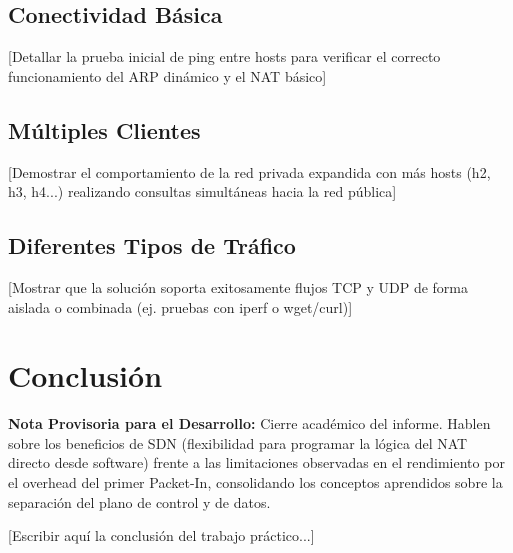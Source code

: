 \documentclass[11pt, a4paper]{article}
\begin{document}
\subsection{Conectividad Básica}
[Detallar la prueba inicial de ping entre hosts para verificar el correcto funcionamiento del ARP dinámico y el NAT básico]

\subsection{Múltiples Clientes}
[Demostrar el comportamiento de la red privada expandida con más hosts (h2, h3, h4...) realizando consultas simultáneas hacia la red pública]

\subsection{Diferentes Tipos de Tráfico}
[Mostrar que la solución soporta exitosamente flujos TCP y UDP de forma aislada o combinada (ej. pruebas con iperf o wget/curl)]


\section{Conclusión}
\label{sec:conclusion}

\begin{small}
\color{blue}
\textbf{Nota Provisoria para el Desarrollo:} 
Cierre académico del informe. Hablen sobre los beneficios de SDN (flexibilidad para programar la lógica del NAT directo desde software) frente a las limitaciones observadas en el rendimiento por el overhead del primer Packet-In, consolidando los conceptos aprendidos sobre la separación del plano de control y de datos.
\end{small}

\vspace{0.5cm}
[Escribir aquí la conclusión del trabajo práctico...]
\end{document}

